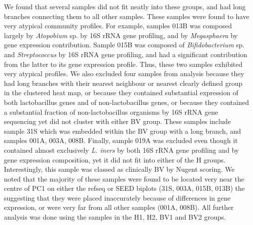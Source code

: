 \documentclass[10pt,letterpaper]{article}
\begin{document}
We found that several samples did not fit neatly into these groups, and had long branches connecting them to all other samples. These samples were found to have very atypical community profiles. For example, samples 013B was composed largely by \emph{Atopobium} sp. by 16S rRNA gene profiling, and by \emph{Megasphaera} by gene expression contribution. Sample 015B was composed of \emph{Bifidobacterium} sp. and \emph{Streptococcus} by 16S rRNA gene profiling, and had a significant contribution from the latter to its gene expression profile. Thus, these two samples exhibited very atypical profiles.   We also excluded four samples from analysis because they had long branches with their nearest neighbour or nearest clearly defined group in the clustered heat map, or because they contained substantial expression of both lactobacillus genes and of non-lactobacillus genes,  or because they contained a substantial fraction of non-lactobacillus organisms by 16S rRNA gene sequencing yet did not cluster with either BV group. These samples include sample 31S which was embedded within the BV group with a long branch, and samples 001A, 003A, 008B. Finally, sample 019A was excluded even though it contained almost exclusively \emph{L. iners} by both 16S rRNA gene profiling and by gene expression composition, yet it did not fit into either of the H groups. Interestingly, this sample was classed as clinically BV by Nugent scoring. We noted that the majority  of these samples were found to be located very near the centre of PC1 on either the refseq or SEED biplots (31S, 003A, 015B, 013B) the suggesting that they were placed inaccurately because of differences in gene expression, or were very far from all other samples (001A, 008B). All further analysis was done using the samples in the H1, H2, BV1 and BV2 groups.  
\end{document}
